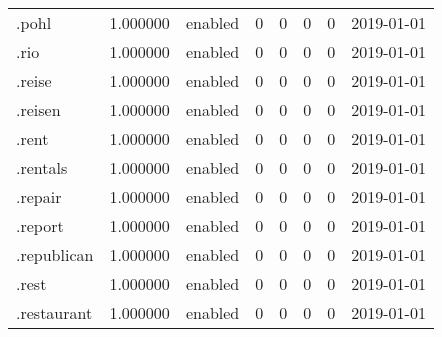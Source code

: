 \begin{tabular}{lrlrrrrl}
.pohl                     &          1.000000 &         enabled &                           0 &                           0 &                           0 &                   0 &           2019-01-01 \\
.rio                      &          1.000000 &         enabled &                           0 &                           0 &                           0 &                   0 &           2019-01-01 \\
.reise                    &          1.000000 &         enabled &                           0 &                           0 &                           0 &                   0 &           2019-01-01 \\
.reisen                   &          1.000000 &         enabled &                           0 &                           0 &                           0 &                   0 &           2019-01-01 \\
.rent                     &          1.000000 &         enabled &                           0 &                           0 &                           0 &                   0 &           2019-01-01 \\
.rentals                  &          1.000000 &         enabled &                           0 &                           0 &                           0 &                   0 &           2019-01-01 \\
.repair                   &          1.000000 &         enabled &                           0 &                           0 &                           0 &                   0 &           2019-01-01 \\
.report                   &          1.000000 &         enabled &                           0 &                           0 &                           0 &                   0 &           2019-01-01 \\
.republican               &          1.000000 &         enabled &                           0 &                           0 &                           0 &                   0 &           2019-01-01 \\
.rest                     &          1.000000 &         enabled &                           0 &                           0 &                           0 &                   0 &           2019-01-01 \\
.restaurant               &          1.000000 &         enabled &                           0 &                           0 &                           0 &                   0 &           2019-01-01 \\

\end{tabular}
